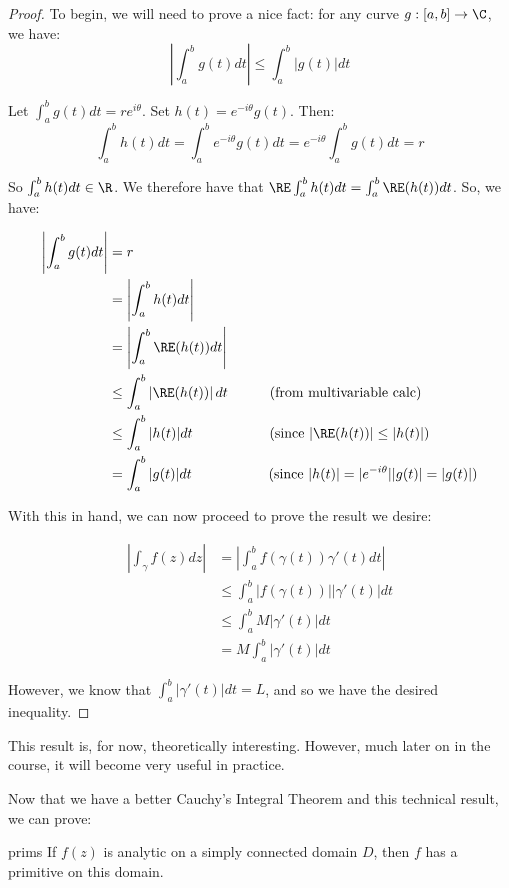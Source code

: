 \begin{proof} To begin, we will need to prove a nice fact: for any curve $g:[a,b]\rightarrow \C$, we have:
$$\left|\int_a^b g(t)dt\right| \le \int_a^b|g(t)|dt$$

Let $\int_a^bg(t)dt = re^{i\theta}$. Set $h(t) = e^{-i\theta}g(t)$. Then:
$$\int_a^bh(t)dt = \int_a^b e^{-i\theta}g(t)dt = e^{-i\theta}\int_a^bg(t)dt = r$$

So $\int_a^bh(t)dt \in \R$. We therefore have that $\RE\int_a^bh(t)dt = \int_a^b\RE(h(t))dt$. So, we have:

\begin{align*}\left|\int_a^bg(t)dt\right| &= r\\
&= \left|\int_a^b h(t)dt\right|\\
&= \left|\int_a^b \RE(h(t))dt\right|\\
&\le \int_a^b \left|\RE(h(t))\right|dt \hspace{30pt} (\text{from multivariable calc})\\
&\le \int_a^b |h(t)|dt \hspace{55pt} (\text{since }|\RE(h(t))| \le |h(t)|)\\
&= \int_a^b |g(t)|dt \hspace{55pt} (\text{since } |h(t)| = |e^{-i\theta}||g(t)| = |g(t)|)
\end{align*}


With this in hand, we can now proceed to prove the result we desire:

\begin{align*} \left|\int_{\gamma} f(z)dz\right| &= \left|\int_a^b f(\gamma(t))\gamma'(t)dt\right|\\
&\le \int_a^b |f(\gamma(t))||\gamma'(t)|dt\\
&\le \int_a^b M|\gamma'(t)|dt\\
&= M\int_a^b |\gamma'(t)|dt
\end{align*}

However, we know that $\int_a^b |\gamma'(t)|dt = L$, and so we have the desired inequality.
\end{proof}

This result is, for now, theoretically interesting. However, much later on in the course, it will become very useful in practice.

Now that we have a better Cauchy's Integral Theorem and this technical result, we can prove:

\begin{thmbo}{}{prims} If $f(z)$ is analytic on a simply connected domain $D$, then $f$ has a primitive on this domain.
\end{thmbo}

